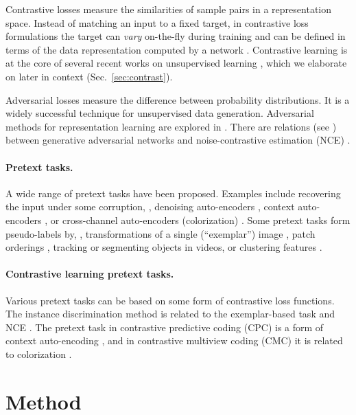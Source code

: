 \documentclass[10pt,twocolumn,letterpaper]{article}
\begin{document}
Contrastive losses \cite{Hadsell2006} measure the similarities of sample pairs in a representation space. Instead of matching an input to a fixed target, in contrastive loss formulations the target can \emph{vary} on-the-fly during training and can be defined in terms of the data representation computed by a network \cite{Hadsell2006}.
Contrastive learning is at the core of several recent works on unsupervised learning \cite{Wu2018a,Oord2018,Hjelm2019,Zhuang2019,Henaff2019,Tian2019,Bachman2019}, which we elaborate on later in context (Sec.~\ref{sec:contrast}).

Adversarial losses \cite{Goodfellow2014} measure the difference between probability distributions. 
It is a widely successful technique for unsupervised data generation. Adversarial methods for representation learning are explored in \cite{Donahue2017,Donahue2019}. There are relations (see \cite{Goodfellow2014}) between generative adversarial networks and noise-contrastive estimation (NCE) \cite{Gutmann2010}.

\paragraph{Pretext tasks.} 
A wide range of pretext tasks have been proposed. Examples include recovering the input under some corruption, \eg, denoising auto-encoders \cite{Vincent2008}, context auto-encoders \cite{Pathak2016}, or cross-channel auto-encoders (colorization) \cite{Zhang2016,Zhang2017}.
Some pretext tasks form pseudo-labels by, \eg, transformations of a single (``exemplar'') image \cite{Dosovitskiy2014}, patch orderings \cite{Doersch2015,Noroozi2016}, tracking \cite{Wang2015a} or segmenting objects \cite{Pathak2017} in videos, or clustering features \cite{Caron2018,Caron2019}.

\paragraph{Contrastive learning \vs pretext tasks.} 
Various pretext tasks can be based on some form of contrastive loss functions.
The instance discrimination method \cite{Wu2018a} is related to the exemplar-based task \cite{Dosovitskiy2014} and 
NCE \cite{Gutmann2010}.
The pretext task in contrastive predictive coding (CPC) \cite{Oord2018} is a form of context auto-encoding \cite{Pathak2016}, and in contrastive multiview coding (CMC) \cite{Tian2019} it is related to colorization \cite{Zhang2016}. 

\section{Method}
\end{document}

